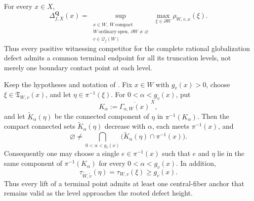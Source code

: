 \begin{corollary}
\label{cor:p031-rational-defect-rooted-terminal-formula}
For every $x\in X$,
\begin{equation}
\label{eq:p031-rational-defect-rooted-terminal-formula}
 \Delta^{\mathbf Q}_{f,X}(x)
  =
  \sup_{\substack{x\in W,\ \overline W\ \mathrm{compact}\\
                  W\ \mathrm{ordinary\ open},\ \partial W\ne\varnothing\\
                  v\in\mathcal Q_f(W)}}
       \ \max_{\xi\in\partial W}\rho_{W,v,x}(\xi).
\end{equation}
Thus every positive witnessing competitor for the complete rational
globalization defect admits a common terminal endpoint for all its
truncation levels, not merely one boundary contact point at each level.
\end{corollary}

\begin{corollary}
\label{cor:p031-finite-flat-persistent-terminal-anchor}
Keep the hypotheses and notation of
.  Fix $x\in W$
with $g_v(x)>0$, choose
$\xi\in\mathfrak T_{W,v}(x)$, and let
$\eta\in\pi^{-1}(\xi)$.  For $0<\alpha<g_v(x)$, put
\[
 K_\alpha:=\overline{\Gamma_{\alpha,W}(x)}^{\,X},
\]
and let $\widetilde K_\alpha(\eta)$ be the connected component of $\eta$ in
$\pi^{-1}(K_\alpha)$.  Then the compact connected sets
$\widetilde K_\alpha(\eta)$ decrease with $\alpha$, each meets
$\pi^{-1}(x)$, and
\begin{equation}
\label{eq:p031-finite-flat-persistent-terminal-anchor}
 \varnothing\ne
 \bigcap_{0<\alpha<g_v(x)}
       \bigl(\widetilde K_\alpha(\eta)\cap\pi^{-1}(x)\bigr).
\end{equation}
Consequently one may choose a single $e\in\pi^{-1}(x)$ such that $e$ and
$\eta$ lie in the same component of $\pi^{-1}(K_\alpha)$ for every
$0<\alpha<g_v(x)$.  In addition,
\begin{equation}
\label{eq:p031-finite-flat-persistent-terminal-trace}
 \tau_{\widetilde W,\widetilde v}(\eta)
   =\tau_{W,v}(\xi)\geq g_v(x).
\end{equation}
Thus every lift of a terminal point admits at least one central-fiber anchor
that remains valid as the level approaches the rooted defect height.
\end{corollary}

